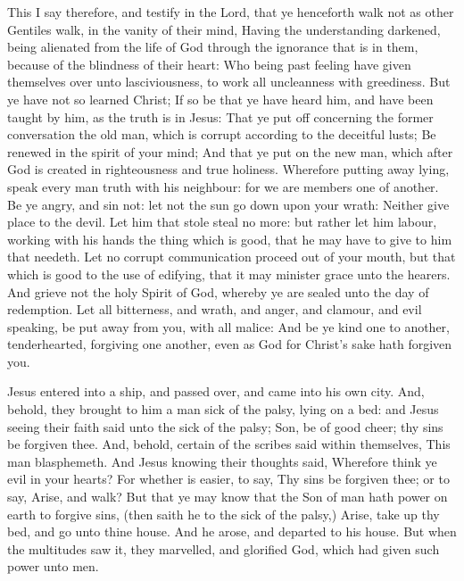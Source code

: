  This I say therefore, and testify in the Lord, that ye henceforth walk not as other Gentiles walk, in the vanity of their mind, Having the understanding darkened, being alienated from the life of God through the ignorance that is in them, because of the blindness of their heart: Who being past feeling have given themselves over unto lasciviousness, to work all uncleanness with greediness. But ye have not so learned Christ; If so be that ye have heard him, and have been taught by him, as the truth is in Jesus: That ye put off concerning the former conversation the old man, which is corrupt according to the deceitful lusts; Be renewed in the spirit of your mind; And that ye put on the new man, which after God is created in righteousness and true holiness. Wherefore putting away lying, speak every man truth with his neighbour: for we are members one of another. Be ye angry, and sin not: let not the sun go down upon your wrath: Neither give place to the devil. Let him that stole steal no more: but rather let him labour, working with his hands the thing which is good, that he may have to give to him that needeth. Let no corrupt communication proceed out of your mouth, but that which is good to the use of edifying, that it may minister grace unto the hearers. And grieve not the holy Spirit of God, whereby ye are sealed unto the day of redemption. Let all bitterness, and wrath, and anger, and clamour, and evil speaking, be put away from you, with all malice: And be ye kind one to another, tenderhearted, forgiving one another, even as God for Christ's sake hath forgiven you.


 Jesus entered into a ship, and passed over, and came into his own city. And, behold, they brought to him a man sick of the palsy, lying on a bed: and Jesus seeing their faith said unto the sick of the palsy; Son, be of good cheer; thy sins be forgiven thee. And, behold, certain of the scribes said within themselves, This man blasphemeth. And Jesus knowing their thoughts said, Wherefore think ye evil in your hearts? For whether is easier, to say, Thy sins be forgiven thee; or to say, Arise, and walk? But that ye may know that the Son of man hath power on earth to forgive sins, (then saith he to the sick of the palsy,) Arise, take up thy bed, and go unto thine house. And he arose, and departed to his house. But when the multitudes saw it, they marvelled, and glorified God, which had given such power unto men.

